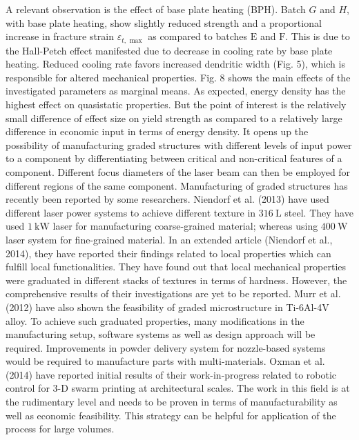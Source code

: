 \documentclass[10pt]{article}
\begin{document}
A relevant observation is the effect of base plate heating (BPH). Batch $G$ and $H$, with base plate heating, show slightly reduced strength and a proportional increase in fracture strain $\varepsilon_{t, \text { max }}$ as compared to batches $\mathrm{E}$ and $\mathrm{F}$. This is due to the Hall-Petch effect manifested due to decrease in cooling rate by base plate heating. Reduced cooling rate favors increased dendritic width (Fig. 5), which is responsible for altered mechanical properties. Fig. 8 shows the main effects of the investigated parameters as marginal means. As expected, energy density has the highest effect on quasistatic properties. But the point of interest is the relatively small difference of effect size on yield strength as compared to a relatively large difference in economic input in terms of energy density. It opens up the possibility of manufacturing graded structures with different levels of input power to a component by differentiating between critical and non-critical features of a component. Different focus diameters of the laser beam can then be employed for different regions of the same component. Manufacturing of graded structures has recently been reported by some researchers. Niendorf et al. (2013) have used different laser power systems to achieve different texture in $316 \mathrm{~L}$ steel. They have used $1 \mathrm{~kW}$ laser for manufacturing coarse-grained material; whereas using $400 \mathrm{~W}$ laser system for fine-grained material. In an extended article (Niendorf et al., 2014), they have reported their findings related to local properties which can fulfill local functionalities. They have found out that local mechanical properties were graduated in different stacks of textures in terms of hardness. However, the comprehensive results of their investigations are yet to be reported. Murr et al. (2012) have also shown the feasibility of graded microstructure in Ti-6Al-4V alloy. To achieve such graduated properties, many modifications in the manufacturing setup, software systems as well as design approach will be required. Improvements in powder delivery system for nozzle-based systems would be required to manufacture parts with multi-materials. Oxman et al. (2014) have reported initial results of their work-in-progress related to robotic control for 3-D swarm printing at architectural scales. The work in this field is at the rudimentary level and needs to be proven in terms of manufacturability as well as economic feasibility. This strategy can be helpful for application of the process for large volumes.
\end{document}

